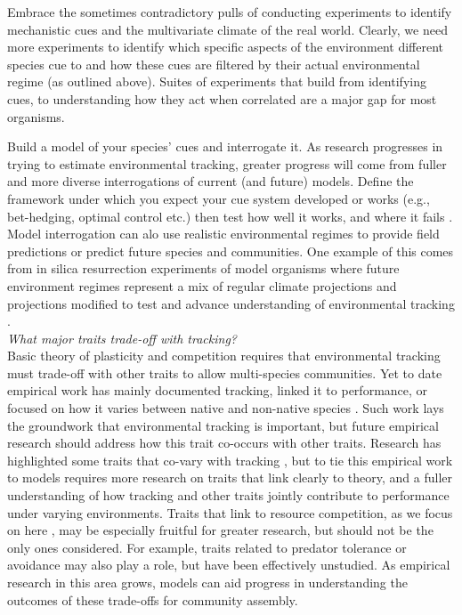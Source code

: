 \documentclass[11pt,letterpaper]{article}
\begin{document}
Embrace the sometimes contradictory pulls of conducting experiments to identify mechanistic cues and the multivariate climate of the real world. Clearly, we need more experiments to identify which specific aspects of the environment different species cue to and how these cues are filtered by their actual environmental regime (as outlined above). Suites of experiments that build from identifying cues, to understanding how they act when correlated are a major gap for most organisms. 

Build a model of your species' cues and interrogate it. As research progresses in trying to estimate environmental tracking, greater progress will come from fuller and more diverse interrogations of current (and future) models. Define the framework under which you expect your cue system developed or works (e.g., bet-hedging, optimal control etc.) then test how well it works, and where it fails \citep[see][for an example]{johanOCR}. Model interrogation can alo use realistic environmental regimes to provide field predictions \citep{Wilczek:2010ad,Wilczek:2009oa} or predict future species and communities. One example of this comes from in silica resurrection experiments of model organisms where future environment regimes represent a mix of regular climate projections and projections modified to test and advance understanding of environmental tracking \citep[e.g., warmer winter and altered photoperiod scenarios in][]{fournier2016}.\\

\emph{What major traits trade-off with tracking?} \\ 
Basic theory of plasticity and competition requires that environmental tracking must trade-off with other traits to allow multi-species communities. Yet to date empirical work has mainly documented tracking, linked it to performance, or focused on how it varies between native and non-native species \citep{Willis:2010al,wolkovichAmBot2013,Zettlemoyer2019}. Such work lays the groundwork that environmental tracking is important, but future empirical research should address how this trait co-occurs with other traits. Research has highlighted some traits that co-vary with tracking \citep[e.g.,][]{kharouba2014,lasky2016,Zhu2016BioLetters}, but to tie this empirical work to models requires more research on traits that link clearly to theory, and a fuller understanding of how tracking and other traits jointly contribute to performance under varying environments. Traits that link to resource competition, as we focus on here \citep[as others have as well, see][]{volkerass}, may be especially fruitful for greater research, but should not be the only ones considered. For example, traits related to predator tolerance or avoidance may also play a role, but have been effectively unstudied.  As empirical research in this area grows, models can aid progress in understanding the outcomes of these trade-offs for community assembly.\\ 
\end{document}
